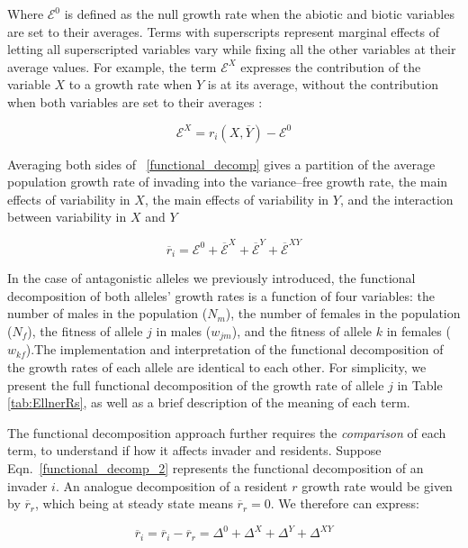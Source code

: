 Where $\mathcal{E}^0$ is defined as the null growth rate when the abiotic and biotic variables are set to their averages. Terms with superscripts represent marginal effects of letting all superscripted variables vary while fixing all the other variables at their average values. For example, the term $\mathcal{E}^X$ expresses the contribution of the variable $X$ to a growth rate when $Y$ is at its average, without the contribution when both variables are set to their averages :

\begin{equation}
  \mathcal{E}^{X} = r_{i}(X,\overline{Y}) - \mathcal{E}^{0}
\end{equation}


Averaging both sides of ~\ref{functional_decomp} gives a partition of the average population growth rate of invading into the variance--free growth rate, the main effects of variability in $X$, the main effects of variability in $Y$, and the interaction between variability in $X$ and $Y$

\begin{equation}
    \overline{r}_{i}= \mathcal{E}^{0} + \overline{\mathcal{E}}^{X}+ \overline{\mathcal{E}}^{Y}+ \overline{\mathcal{E}}^{XY}
   \label{functional_decomp_2}
\end{equation}

In the case of antagonistic alleles we previously introduced, the functional decomposition of both alleles' growth rates is a function of four variables: the number of males in the population ($N_{m}$), the number of females in the population ($N_{f}$), the fitness of allele $j$ in males ($w_{jm}$), and the fitness of allele $k$ in females ($w_{kf}$).The implementation and interpretation of the functional decomposition of the growth rates of each allele are identical to each other. For simplicity,  we present the full functional decomposition of the growth rate of allele $j$ in Table \ref{tab:EllnerRs}, as well as a brief description of the meaning of each term.

The functional decomposition approach further requires the \textit{comparison} of each term, to understand if how it affects invader and residents. Suppose Eqn.~\ref{functional_decomp_2} represents the functional  decomposition of an invader $i$. An analogue decomposition of a resident $r$ growth rate would be given by $\overline{r}_{r}$, which being at steady state means $\overline{r}_{r}=0$. We therefore can express:


\begin{equation}
    \overline{r}_{i}= \overline{r}_{i} - \overline{r}_{r} = \Delta^{0} + \Delta^{X}+  \Delta^{Y}+ \Delta^{XY}
   \label{functional_decomp_3}
\end{equation}

